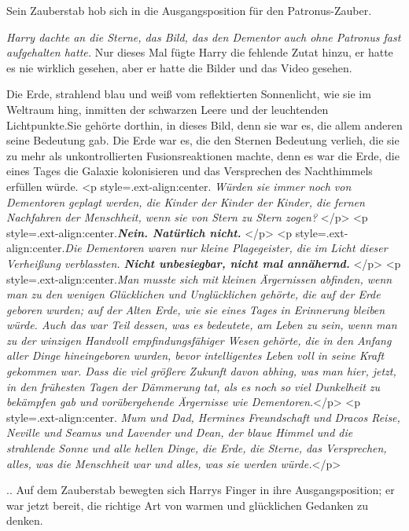 Sein Zauberstab hob sich in die Ausgangsposition für den Patronus-Zauber.

\emph{Harry dachte an die Sterne, das Bild, das den Dementor auch ohne Patronus
fast aufgehalten hatte.} Nur dieses Mal fügte Harry die fehlende Zutat hinzu, er
hatte es nie wirklich gesehen, aber er hatte die Bilder und das Video gesehen.

Die Erde, strahlend blau und weiß vom reflektierten Sonnenlicht, wie sie im
Weltraum hing, inmitten der schwarzen Leere und der leuchtenden Lichtpunkte.Sie
gehörte dorthin, in dieses Bild, denn sie war es, die allem anderen seine
Bedeutung gab. Die Erde war es, die den Sternen Bedeutung verlieh, die sie zu
mehr als unkontrollierten Fusionsreaktionen machte, denn es war die Erde, die
eines Tages die Galaxie kolonisieren und das Versprechen des Nachthimmels
erfüllen würde. <p style=\grqq{}.ext-align:center\grqq{}. \emph{ Würden sie
immer noch von Dementoren geplagt werden, die Kinder der Kinder der Kinder, die
fernen Nachfahren der Menschheit, wenn sie von Stern zu Stern zogen? }</p> <p
style=\grqq{}.ext-align:center\grqq{}.\emph{\textbf{Nein. Natürlich nicht.}
}</p> <p style=\grqq{}.ext-align:center\grqq{}.\emph{Die Dementoren waren nur
kleine Plagegeister, die im Licht dieser Verheißung verblassten. \textbf{Nicht
unbesiegbar, nicht mal annähernd.} }</p> <p
style=\grqq{}.ext-align:center\grqq{}.\emph{Man musste sich mit kleinen
Ärgernissen abfinden, wenn man zu den wenigen Glücklichen und Unglücklichen
gehörte, die auf der Erde geboren wurden; auf der Alten Erde, wie sie eines
Tages in Erinnerung bleiben würde. Auch das war Teil dessen, was es bedeutete,
am Leben zu sein, wenn man zu der winzigen Handvoll empfindungsfähiger Wesen
gehörte, die in den Anfang aller Dinge hineingeboren wurden, bevor intelligentes
Leben voll in seine Kraft gekommen war. Dass die viel größere Zukunft davon
abhing, was man hier, jetzt, in den frühesten Tagen der Dämmerung tat, als es
noch so viel Dunkelheit zu bekämpfen gab und vorübergehende Ärgernisse wie
Dementoren.}</p> <p style=\grqq{}.ext-align:center\grqq{}.\emph{ Mum und Dad,
Hermines Freundschaft und Dracos Reise, Neville und Seamus und Lavender und
Dean, der blaue Himmel und die strahlende Sonne und alle hellen Dinge, die Erde,
die Sterne, das Versprechen, alles, was die Menschheit war und alles, was sie
werden würde.}</p>

.. Auf dem Zauberstab bewegten sich Harrys Finger in ihre Ausgangsposition; er
war jetzt bereit, die richtige Art von warmen und glücklichen Gedanken zu
denken.

